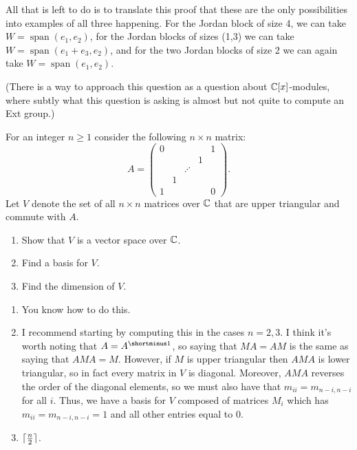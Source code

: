 \begin{solution}
All that is left to do is to translate this proof that these are the only possibilities into examples of all three happening. For the Jordan block of size 4, we can take $W = \operatorname{span}(e_1,e_2)$, for the Jordan blocks of sizes (1,3) we can take $W = \operatorname{span}(e_1+e_3,e_2)$, and for the two Jordan blocks of size 2 we can again take $W = \operatorname{span}(e_1,e_2)$.

(There is a way to approach this question as a question about $\mathbb{C}[x]$-modules, where subtly what this question is asking is almost but not quite to compute an Ext group.)
\end{solution}

%
\begin{question}[subtitle = August 2024 Problem 3,ID=Aug24_3]
For an integer $n \geq 1$ consider the following $n \times n$ matrix:
\[A = \begin{pmatrix}
0 & & & & 1 \\
& & & 1 & \\
& & \iddots & &\\
& 1 & & & \\
1 & & & & 0
\end{pmatrix}.\]
Let $V$ denote the set of all $n \times n$ matrices over $\mathbb{C}$ that are upper triangular and commute with $A$.
\begin{enumerate}
    \item Show that $V$ is a vector space over $\mathbb{C}$.
    \item Find a basis for $V$.
    \item Find the dimension of $V$.
\end{enumerate}
\end{question}
\begin{solution}
\begin{enumerate}
    \item You know how to do this.
    \item I recommend starting by computing this in the cases $n = 2,3$. I think it's worth noting that $A = A\inv$, so saying that $MA = AM$ is the same as saying that $AMA = M$. However, if $M$ is upper triangular then $AMA$ is lower triangular, so in fact every matrix in $V$ is diagonal. Moreover, $AMA$ reverses the order of the diagonal elements, so we must also have that $m_{ii} = m_{n-i,n-i}$ for all $i$. Thus, we have a basis for $V$ composed of matrices $M_i$ which has $m_{ii} = m_{n-i,n-i} = 1$ and all other entries equal to 0.
    \item $\lceil\tfrac{n}{2}\rceil$.
\end{enumerate}
\end{solution}

